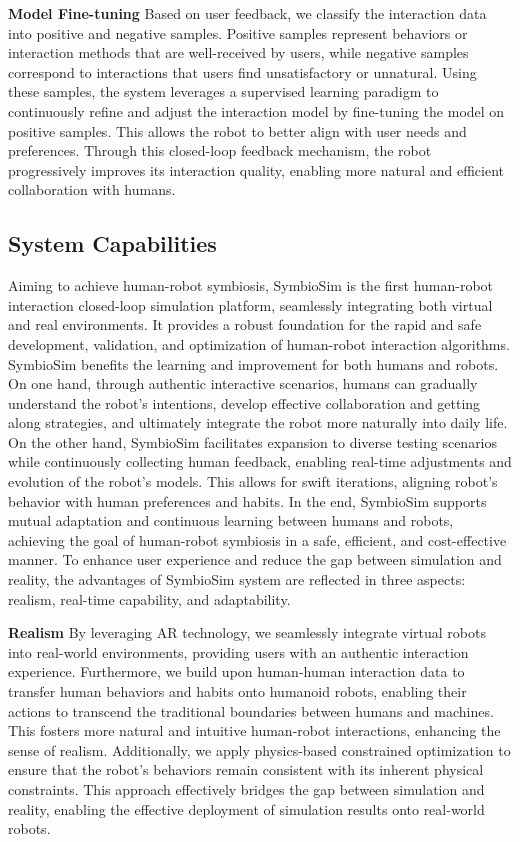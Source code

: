 \textbf{Model Fine-tuning}
Based on user feedback, we classify the interaction data into positive and negative samples. Positive samples represent behaviors or interaction methods that are well-received by users, while negative samples correspond to interactions that users find unsatisfactory or unnatural. Using these samples, the system leverages a supervised learning paradigm to continuously refine and adjust the interaction model by fine-tuning the model on positive samples. This allows the robot to better align with user needs and preferences. Through this closed-loop feedback mechanism, the robot progressively improves its interaction quality, enabling more natural and efficient collaboration with humans.



\subsection{System Capabilities}
\label{sec:capabilities}
Aiming to achieve human-robot symbiosis, SymbioSim is the first human-robot interaction closed-loop simulation platform, seamlessly integrating both virtual and real environments. It provides a robust foundation for the rapid and safe development, validation, and optimization of human-robot interaction algorithms. SymbioSim benefits the learning and improvement for both humans and robots. On one hand, through authentic interactive scenarios, humans can gradually understand the robot’s intentions, develop effective collaboration and getting along strategies, and ultimately integrate the robot more naturally into daily life. On the other hand, SymbioSim facilitates expansion to diverse testing scenarios while continuously collecting human feedback, enabling real-time adjustments and evolution of the robot's models. This allows for swift iterations, aligning robot's behavior with human preferences and habits. In the end, SymbioSim supports mutual adaptation and continuous learning between humans and robots, achieving the goal of human-robot symbiosis in a safe, efficient, and cost-effective manner. To enhance user experience and reduce the gap between simulation and reality, the advantages of SymbioSim system are reflected in three aspects: realism, real-time capability, and adaptability.


\textbf{Realism}
By leveraging AR technology, we seamlessly integrate virtual robots into real-world environments, providing users with an authentic interaction experience. Furthermore, we build upon human-human interaction data to transfer human behaviors and habits onto humanoid robots, enabling their actions to transcend the traditional boundaries between humans and machines. This fosters more natural and intuitive human-robot interactions, enhancing the sense of realism. Additionally, we apply physics-based constrained optimization to ensure that the robot’s behaviors remain consistent with its inherent physical constraints. This approach effectively bridges the gap between simulation and reality, enabling the effective deployment of simulation results onto real-world robots.

